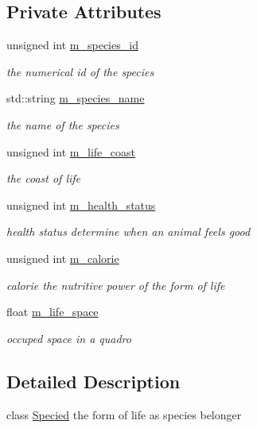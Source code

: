 \subsection*{Private Attributes}
\begin{DoxyCompactItemize}
\item 
unsigned int \hyperlink{classSpecied_a7ddb2bbcdf287f07894da310b0a37dd0}{m\_\-species\_\-id}
\begin{DoxyCompactList}\small\item\em the numerical id of the species \end{DoxyCompactList}\item 
std::string \hyperlink{classSpecied_a028ecdb54e6a4f37406d3abcccf0de1c}{m\_\-species\_\-name}
\begin{DoxyCompactList}\small\item\em the name of the species \end{DoxyCompactList}\item 
unsigned int \hyperlink{classSpecied_acbfa5daa32bfb761a44f9d6e0763762e}{m\_\-life\_\-coast}
\begin{DoxyCompactList}\small\item\em the coast of life \end{DoxyCompactList}\item 
unsigned int \hyperlink{classSpecied_a7d716a70352c40bbe1ff3bd8c5719f29}{m\_\-health\_\-status}
\begin{DoxyCompactList}\small\item\em health status determine when an animal feels good \end{DoxyCompactList}\item 
unsigned int \hyperlink{classSpecied_ad02e0fffd55e2aa9227aa8034a05d374}{m\_\-calorie}
\begin{DoxyCompactList}\small\item\em calorie the nutritive power of the form of life \end{DoxyCompactList}\item 
float \hyperlink{classSpecied_a97ee13a155f2b2a58fed03279a2faa09}{m\_\-life\_\-space}
\begin{DoxyCompactList}\small\item\em occuped space in a quadro \end{DoxyCompactList}\end{DoxyCompactItemize}


\subsection{Detailed Description}
class \hyperlink{classSpecied}{Specied} the form of life as species belonger 

